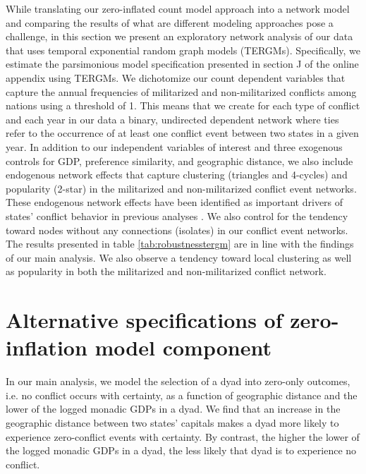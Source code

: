\documentclass[12pt]{article}
\theoremstyle{hypothesis}
\begin{document}
While translating our zero-inflated count model approach into a network model and comparing the results of what are different modeling approaches pose a challenge, in this section we present an exploratory network analysis of our data that uses temporal exponential random graph models (TERGMs). Specifically, we estimate the parsimonious model specification presented in section J of the online appendix using TERGMs. We dichotomize our count dependent variables that capture the annual frequencies of militarized and non-militarized conflicts among nations using a threshold of 1. This means that we create for each type of conflict and each year in our data a binary, undirected dependent network where ties refer to the occurrence of at least one conflict event between two states in a given year. In addition to our independent variables of interest and three exogenous controls for GDP, preference similarity, and geographic distance, we also include endogenous network effects that capture clustering (triangles and 4-cycles) and popularity (2-star) in the militarized and non-militarized conflict event networks. These endogenous network effects have been identified as important drivers of states' conflict behavior in previous analyses \citep{Cranmer:2011}. We also control for the tendency toward nodes without any connections (isolates) in our conflict event networks. The results presented in table \ref{tab:robustnesstergm} are in line with the findings of our main analysis. We also observe a tendency toward local clustering as well as popularity in both the militarized and non-militarized conflict network.

\begin{landscape}



\end{landscape}

\newpage

\section{Alternative specifications of zero-inflation model component}

\doublespace In our main analysis, we model the selection of a dyad into zero-only outcomes, i.e. no conflict occurs with certainty, as a function of geographic distance and the lower of the logged monadic GDPs in a dyad. We find that an increase in the geographic distance between two states' capitals makes a dyad more likely to experience zero-conflict events with certainty. By contrast, the higher the lower of the logged monadic GDPs in a dyad, the less likely that dyad is to experience no conflict.
\end{document}

